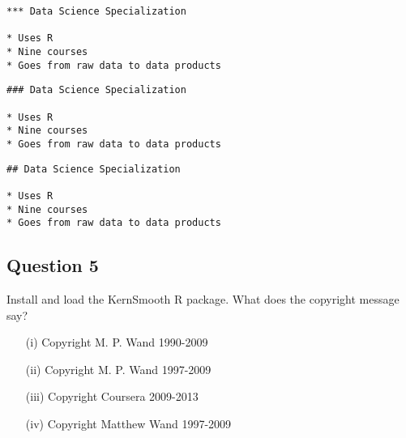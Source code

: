 \documentclass[12pt]{article}
\begin{document}
\begin{framed}
\begin{verbatim}
*** Data Science Specialization 

* Uses R 
* Nine courses 
* Goes from raw data to data products
\end{verbatim}
\end{framed}

\begin{framed}
\begin{verbatim}
### Data Science Specialization 

* Uses R 
* Nine courses 
* Goes from raw data to data products
\end{verbatim}
\end{framed}

\begin{framed}
\begin{verbatim}
## Data Science Specialization 

* Uses R 
* Nine courses 
* Goes from raw data to data products
\end{verbatim}
\end{framed}
\subsection{Question 5}
Install and load the KernSmooth R package. What does the copyright message say?
\begin{itemize}
\item[(i)] Copyright M. P. Wand 1990-2009
\item[(ii)] Copyright M. P. Wand 1997-2009
\item[(iii)] Copyright Coursera 2009-2013
\item[(iv)] Copyright Matthew Wand 1997-2009
\end{itemize}

\newpage
\end{document}
